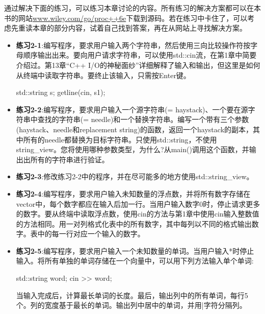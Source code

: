 
通过解决下面的练习，可以练习本章讨论的内容。所有练习的解决方案都可以在本书的网站\url{www.wiley.com/go/proc++6e}下载到源码。若在练习中卡住了，可以考虑先重读本章的部分内容，试着自己找到答案，再在从网站上寻找解决方案。

\begin{itemize}
\item
\textbf{练习2-1}:编写程序，要求用户输入两个字符串，然后使用三向比较操作符按字母顺序输出出来。要向用户请求字符串，可以使用std::cin流，在第1章中简要介绍过。第13章“C++ I/O的神秘面纱”详细解释了输入和输出，但这里是如何从终端中读取字符串。要终止该输入，只需按Enter键。

\begin{cpp}
std::string s;
getline(cin, s1);
\end{cpp}

\item
\textbf{练习2-2}:编写程序，要求用户输入一个源字符串(= haystack)、一个要在源字符串中查找的字符串(= needle)和一个替换字符串。编写一个带有三个参数(haystack、needle和replacement string)的函数，返回一个haystack的副本，其中所有的needle都替换为目标字符串。只使用std::string，不使用string\_view。您将使用哪种参数类型，为什么?从main()调用这个函数，并输出出所有的字符串进行验证。

\item
\textbf{练习2-3}:修改练习2-2中的程序，并在尽可能多的地方使用std::string\_view。

\item
\textbf{练习2-4}:编写程序，要求用户输入未知数量的浮点数，并将所有数字存储在vector中，每个数字都应在输入后加一行。当用户输入数字0时，停止请求更多的数字。要从终端中读取浮点数，使用cin的方法与第1章中使用cin输入整数值的方法相同。用一对列格式化表中的所有数字，其中每列以不同的格式输出数字。表中的每一行对应一个输入的数字。

\item
\textbf{练习2-5}:编写程序，要求用户输入一个未知数量的单词。当用户输入*时停止输入。将所有单独的单词存储在一个向量中，可以用下列方法输入单个单词:

\begin{cpp}
std::string word;
cin >> word;
\end{cpp}

当输入完成后，计算最长单词的长度。最后，输出列中的所有单词，每行5个。列的宽度基于最长的单词。输出列中居中的单词，并用|字符分隔列。
\end{itemize}



